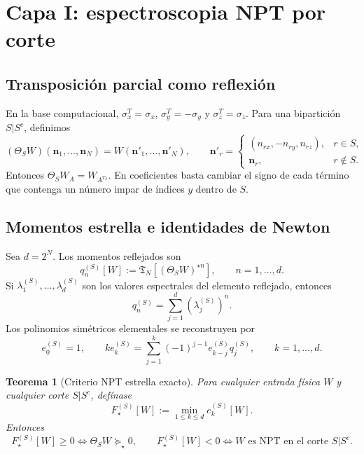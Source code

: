 \documentclass[11pt,a4paper]{article}
\newcommand{\Tfun}{\mathfrak T}
\newcommand{\Fstar}{F_{\star}}
\newcommand{\starprod}{\star}
\newtheorem{theorem}{Teorema}
\theoremstyle{definition}
\begin{document}
\section{Capa I: espectroscopia NPT por corte}

\subsection{Transposición parcial como reflexión}

En la base computacional, $\sigma_x^T=\sigma_x$,
$\sigma_y^T=-\sigma_y$ y $\sigma_z^T=\sigma_z$. Para una bipartición
$S|S^c$, definimos
\begin{equation}
 (\Theta_SW)(\bm n_1,\ldots,\bm n_N)
 =W(\bm n'_1,\ldots,\bm n'_N),
 \qquad
 \bm n'_r=\begin{cases}(n_{rx},-n_{ry},n_{rz}),&r\in S,\\
 \bm n_r,&r\notin S.
 \end{cases}
 \label{eq:reflection}
\end{equation}
Entonces $\Theta_SW_A=W_{A^{T_S}}$. En coeficientes basta cambiar el signo de
cada término que contenga un número impar de índices $y$ dentro de $S$.

\subsection{Momentos estrella e identidades de Newton}

Sea $d=2^N$. Los momentos reflejados son
\begin{equation}
 q_n^{(S)}[W]
 :=\Tfun_N\!\left[(\Theta_SW)^{\starprod n}\right],
 \qquad n=1,\ldots,d.
 \label{eq:q-moments}
\end{equation}
Si $\lambda_1^{(S)},\ldots,\lambda_d^{(S)}$ son los valores espectrales del
elemento reflejado, entonces
\begin{equation}
 q_n^{(S)}=\sum_{j=1}^{d}(\lambda_j^{(S)})^n.
 \label{eq:power-sums}
\end{equation}
Los polinomios simétricos elementales se reconstruyen por
\begin{equation}
 e_0^{(S)}=1,\qquad
 k e_k^{(S)}=\sum_{j=1}^{k}(-1)^{j-1}e_{k-j}^{(S)}q_j^{(S)},
 \qquad k=1,\ldots,d.
 \label{eq:newton}
\end{equation}

\begin{theorem}[Criterio NPT estrella exacto]
Para cualquier entrada física $W$ y cualquier corte $S|S^c$, defínase
\begin{equation}
 \Fstar^{(S)}[W]:=\min_{1\leq k\leq d}e_k^{(S)}[W].
 \label{eq:Fstar}
\end{equation}
Entonces
\begin{equation}
 \Fstar^{(S)}[W]\geq0
 \iff \Theta_SW\succeq_\star0,
 \qquad
 \Fstar^{(S)}[W]<0
 \iff \text{$W$ es NPT en el corte $S|S^c$}.
 \label{eq:Fstar-theorem}
\end{equation}
\end{theorem}
\end{document}
